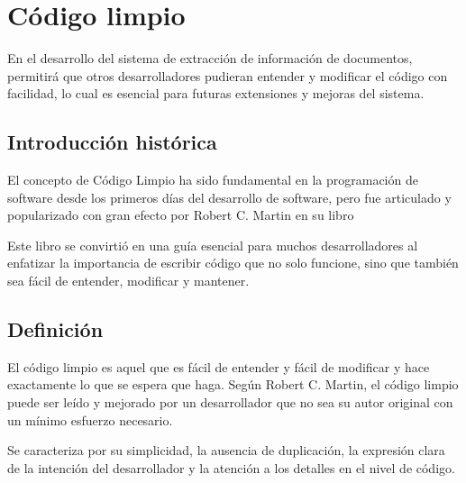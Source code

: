 \section{Código limpio}\label{sec:clean_code}

En el desarrollo del sistema de extracción de información de documentos, permitirá que otros desarrolladores pudieran
entender y modificar el código con facilidad, lo cual es esencial para futuras extensiones y mejoras del sistema.

\subsection*{Introducción histórica}
El concepto de Código Limpio ha sido fundamental en la programación de software desde los primeros días del desarrollo
de software, pero fue articulado y popularizado con gran efecto por Robert C. Martin en su libro~\cite{book_martin_2008}

Este libro se convirtió en una guía esencial para muchos desarrolladores al enfatizar la importancia de escribir código
que no solo funcione, sino que también sea fácil de entender, modificar y mantener.

\subsection*{Definición}
El código limpio es aquel que es fácil de entender y fácil de modificar y hace exactamente lo que se espera que haga.
Según Robert C. Martin, el código limpio puede ser leído y mejorado por un desarrollador que no sea su autor original
con un mínimo esfuerzo necesario.

Se caracteriza por su simplicidad, la ausencia de duplicación, la expresión clara de la intención del desarrollador y
la atención a los detalles en el nivel de código.
